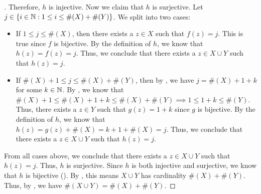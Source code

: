 \begin{proof}[]
  Therefore, \(h\) is injective.
  Now we claim that \(h\) is surjective.
  Let \(j \in \left\lbrace i \in \mathbb{N} : 1 \leq i \leq \#(X) + \#(Y)\right\rbrace\).
  We split into two cases:
  \begin{itemize}
    \item If \(1 \leq j \leq \#(X)\), then there exists a \(z \in X\) such that \(f(z) = j\).
          This is true since \(f\) is bijective.
          By the definition of \(h\), we know that \(h(z) = f(z) = j\).
          Thus, we conclude that there exists a \(z \in X \cup Y\) such that \(h(z) = j\).
    \item If \(\#(X) + 1 \leq j \leq \#(X) + \#(Y)\), then by , we have \(j = \#(X) + 1 + k\) for some \(k \in \mathbb{N}\).
          By , we know that \(\#(X) + 1 \leq \#(X) + 1 + k \leq \#(X) + \#(Y) \implies 1 \leq 1 + k \leq \#(Y)\).
          Thus, there exists a \(z \in Y\) such that \(g(z) = 1 + k\) since \(g\) is bijective.
          By the definition of \(h\), we know that \(h(z) = g(z) + \#(X) = k + 1 + \#(X) = j\).
          Thus, we conclude that there exists a \(z \in X \cup Y\) such that \(h(z) = j\).
  \end{itemize}
  From all cases above, we conclude that there exists a \(z \in X \cup Y\) such that \(h(z) = j\).
  Thus, \(h\) is surjective.
  Since \(h\) is both injective and surjective, we know that \(h\) is bijective ().
  By , this means \(X \cup Y\) has cardinality \(\#(X) + \#(Y)\).
  Thus, by , we have \(\#(X \cup Y) = \#(X) + \#(Y)\).
\end{proof}

